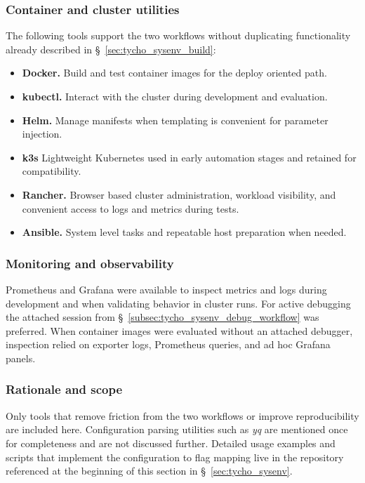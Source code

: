 \subsubsection{Container and cluster utilities}
\label{subsec:tycho_sysenv_util_cluster}
The following tools support the two workflows without duplicating functionality already described in \S~\ref{sec:tycho_sysenv_build}:
\begin{itemize}
  \item \textbf{Docker.} Build and test container images for the deploy oriented path.
  \item \textbf{kubectl.} Interact with the cluster during development and evaluation.
  \item \textbf{Helm.} Manage manifests when templating is convenient for parameter injection.
  \item \textbf{k3s} Lightweight Kubernetes used in early automation stages and retained for compatibility.
  \item \textbf{Rancher.} Browser based cluster administration, workload visibility, and convenient access to logs and metrics during tests.
  \item \textbf{Ansible.} System level tasks and repeatable host preparation when needed.
\end{itemize}

\subsubsection{Monitoring and observability}
\label{subsec:tycho_sysenv_util_monitoring}
Prometheus and Grafana were available to inspect metrics and logs during development and when validating behavior in cluster runs. For active debugging the attached session from \S~\ref{subsec:tycho_sysenv_debug_workflow} was preferred. When container images were evaluated without an attached debugger, inspection relied on exporter logs, Prometheus queries, and ad hoc Grafana panels.

\subsubsection{Rationale and scope}
\label{subsec:tycho_sysenv_util_rationale}
Only tools that remove friction from the two workflows or improve reproducibility are included here. Configuration parsing utilities such as \textit{yq} are mentioned once for completeness and are not discussed further. Detailed usage examples and scripts that implement the configuration to flag mapping live in the repository referenced at the beginning of this section in \S~\ref{sec:tycho_sysenv}.
